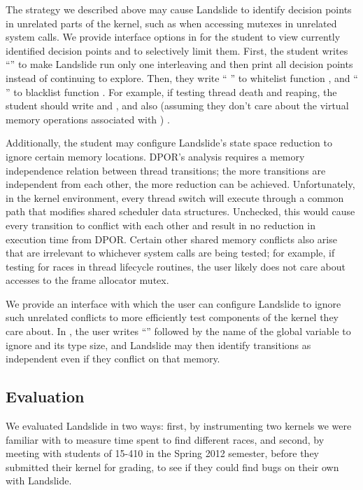 The strategy we described above may cause Landslide to identify decision points in unrelated parts of the kernel, such as when accessing mutexes in unrelated system calls.
We provide interface options in  for the student to view currently identified decision points and to selectively limit them.
First, the student writes ``'' to make Landslide run only one interleaving and then print all decision points instead of continuing to explore.
Then, they write `` '' to whitelist function , and `` '' to blacklist function .
For example, if testing thread death and reaping, the student should write  and  , and also
(assuming they don't care about the virtual memory operations associated with )
 .

Additionally, the student may configure Landslide's state space reduction to ignore certain memory locations. DPOR's analysis requires a memory independence relation between thread transitions; the more transitions are independent from each other, the more reduction can be achieved.
Unfortunately, in the kernel environment, every thread switch will execute through a common path that modifies shared scheduler data structures.
Unchecked, this would cause every transition to conflict with each other and result in no reduction in execution time from DPOR.
Certain other shared memory conflicts also arise that are irrelevant to whichever system calls are being tested; for example, if testing for races in thread lifecycle routines, the user likely does not care about accesses to the frame allocator mutex.

We provide an interface with which the user can configure Landslide to ignore such unrelated conflicts to more efficiently test components of the kernel they care about. In , the user writes ``'' followed by the name of the global variable to ignore and its type size, and Landslide may then identify transitions as independent even if they conflict on that memory.

\subsection{Evaluation}

We evaluated Landslide in two ways: first, by instrumenting two kernels we were familiar with to measure time spent to find different races, and second, by meeting with students of 15-410 in the Spring 2012 semester, before they submitted their kernel for grading, to see if they could find bugs on their own with Landslide.

